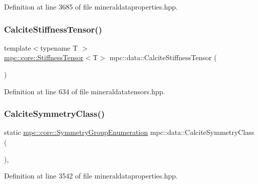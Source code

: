 Definition at line 3685 of file mineraldataproperties.\+hpp.

\mbox{\label{namespacempc_1_1data_aa3d5b13f695a164174e1cf4b8b074605}} 
\subsubsection{\texorpdfstring{Calcite\+Stiffness\+Tensor()}{CalciteStiffnessTensor()}}
{\footnotesize\ttfamily template$<$typename T $>$ \\
\mbox{\hyperlink{structmpc_1_1core_1_1_stiffness_tensor}{mpc\+::core\+::\+Stiffness\+Tensor}}$<$T$>$ mpc\+::data\+::\+Calcite\+Stiffness\+Tensor (\begin{DoxyParamCaption}{ }\end{DoxyParamCaption})}



Definition at line 634 of file mineraldatatensors.\+hpp.

\mbox{\label{namespacempc_1_1data_ae9e7dd0d5810355b4e3f4127bead6bc1}} 
\subsubsection{\texorpdfstring{Calcite\+Symmetry\+Class()}{CalciteSymmetryClass()}}
{\footnotesize\ttfamily static \mbox{\hyperlink{namespacempc_1_1core_a9d979684062547055a0ef5c13077bad8}{mpc\+::core\+::\+Symmetry\+Group\+Enumeration}} mpc\+::data\+::\+Calcite\+Symmetry\+Class (\begin{DoxyParamCaption}{ }\end{DoxyParamCaption})\hspace{0.3cm}{\ttfamily [inline]}, {\ttfamily [static]}}



Definition at line 3542 of file mineraldataproperties.\+hpp.

\mbox{\label{namespacempc_1_1data_acc40bbee4a24bcf677ea75af0b0d38b4}} 
